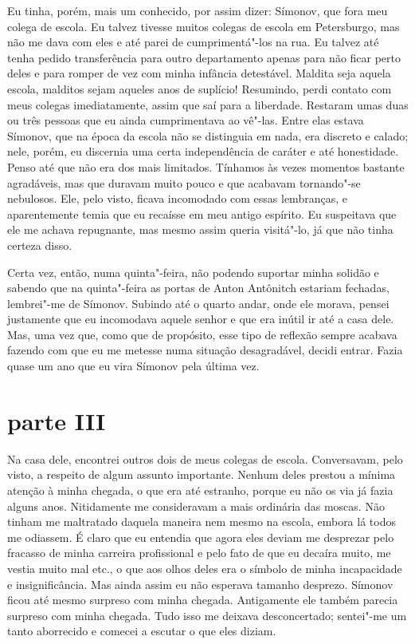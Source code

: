 Eu tinha, porém, mais um conhecido, por assim dizer: Símonov, que fora
meu colega de escola. Eu talvez tivesse muitos colegas de escola em
Petersburgo, mas não me dava com eles e até parei de cumprimentá"-los na
rua. Eu talvez até tenha pedido transferência para outro departamento
apenas para não ficar perto deles e para romper de vez com minha
infância detestável. Maldita seja aquela escola, malditos sejam aqueles
anos de suplício! Resumindo, perdi contato com meus colegas
imediatamente, assim que saí para a liberdade. Restaram umas duas ou
três pessoas que eu ainda cumprimentava ao vê"-las. Entre elas estava
Símonov, que na época da escola não se distinguia em nada, era discreto
e calado; nele, porém, eu discernia uma certa independência de caráter
e até honestidade. Penso até que não era dos mais limitados. Tínhamos
às vezes momentos bastante agradáveis, mas que duravam muito pouco e
que acabavam tornando"-se nebulosos. Ele, pelo visto, ficava incomodado
com essas lembranças, e aparentemente temia que eu recaísse em meu
antigo espírito. Eu suspeitava que ele me achava repugnante, mas mesmo
assim queria visitá"-lo, já que não tinha certeza disso.

Certa vez, então, numa quinta"-feira, não podendo suportar minha solidão
e sabendo que na quinta"-feira as portas de Anton Antônitch estariam
fechadas, lembrei"-me de Símonov. Subindo até o quarto andar, onde ele
morava, pensei justamente que eu incomodava aquele senhor e que era
inútil ir até a casa dele. Mas, uma vez que, como que de propósito,
esse tipo de reflexão sempre acabava fazendo com que eu me metesse numa
situação desagradável, decidi entrar. Fazia quase um ano que eu vira
Símonov pela última vez.


\section{parte III}

Na casa dele, encontrei outros dois de meus colegas de escola.
Conversavam, pelo visto, a respeito de algum assunto importante. Nenhum
deles prestou a mínima atenção à minha chegada, o que era até estranho,
porque eu não os via já fazia alguns anos. Nitidamente me consideravam
a mais ordinária das moscas. Não tinham me maltratado daquela maneira
nem mesmo na escola, embora lá todos me odiassem. É claro que eu
entendia que agora eles deviam me desprezar pelo fracasso de minha
carreira profissional e pelo fato de que eu decaíra muito, me vestia
muito mal etc., o que aos olhos deles era o símbolo de minha
incapacidade e insignificância. Mas ainda assim eu não esperava tamanho
desprezo. Símonov ficou até mesmo surpreso com minha chegada.
Antigamente ele também parecia surpreso com minha chegada. Tudo isso me
deixava desconcertado; sentei"-me um tanto aborrecido e comecei a
escutar o que eles diziam.

